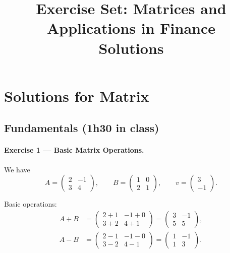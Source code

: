 \documentclass[11pt]{article}
\title{Exercise Set: Matrices and Applications in Finance\\[0.3em]
\large Solutions}
\author{}
\date{}
\begin{document}
\maketitle

\section{Solutions for Matrix}

\subsection*{Fundamentals (1h30 in class)}

\paragraph{Exercise 1 — Basic Matrix Operations.}

We have
\[
A=\begin{pmatrix}2 & -1 \\ 3 & 4\end{pmatrix},\qquad 
B=\begin{pmatrix}1 & 0 \\ 2 & 1\end{pmatrix},\qquad 
v = \begin{pmatrix}3 \\ -1\end{pmatrix}.
\]

Basic operations:
\begin{align*}
A+B &= 
\begin{pmatrix}2+1 & -1+0 \\ 3+2 & 4+1\end{pmatrix}
=
\begin{pmatrix}3 & -1 \\ 5 & 5\end{pmatrix},\\[1ex]
A-B &= 
\begin{pmatrix}2-1 & -1-0 \\ 3-2 & 4-1\end{pmatrix}
=
\begin{pmatrix}1 & -1 \\ 1 & 3\end{pmatrix}.
\end{align*}
\end{document}
